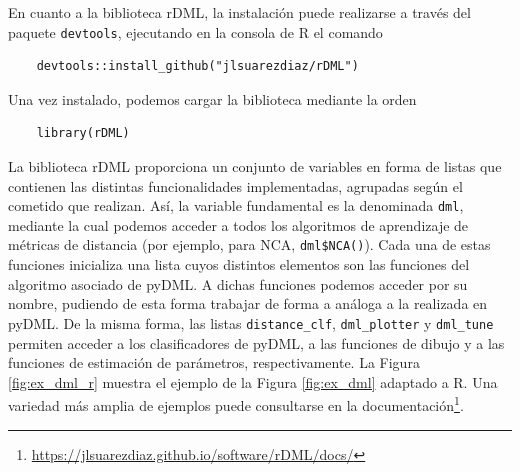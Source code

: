 En cuanto a la biblioteca rDML, la instalación puede realizarse a través del paquete \texttt{devtools}, ejecutando en la consola de R el comando
\begin{verbatim}
    devtools::install_github("jlsuarezdiaz/rDML")
\end{verbatim}
Una vez instalado, podemos cargar la biblioteca mediante la orden
\begin{verbatim}
    library(rDML)
\end{verbatim}
La biblioteca rDML proporciona un conjunto de variables en forma de listas que contienen las distintas funcionalidades implementadas, agrupadas según el cometido que realizan. Así, la variable fundamental es la denominada \texttt{dml}, mediante la cual podemos acceder a todos los algoritmos de aprendizaje de métricas de distancia (por ejemplo, para NCA, \texttt{dml\$NCA()}). Cada una de estas funciones inicializa una lista cuyos distintos elementos son las funciones del algoritmo asociado de pyDML. A dichas funciones podemos acceder por su nombre, pudiendo de esta forma trabajar de forma a análoga a la realizada en pyDML. De la misma forma, las listas \texttt{distance\_clf}, \texttt{dml\_plotter} y \texttt{dml\_tune} permiten acceder a los clasificadores de pyDML, a las funciones de dibujo y a las funciones de estimación de parámetros, respectivamente. La Figura \ref{fig:ex_dml_r} muestra el ejemplo de la Figura \ref{fig:ex_dml} adaptado a R. Una variedad más amplia de ejemplos puede consultarse en la documentación\footnote{\url{https://jlsuarezdiaz.github.io/software/rDML/docs/}}.
